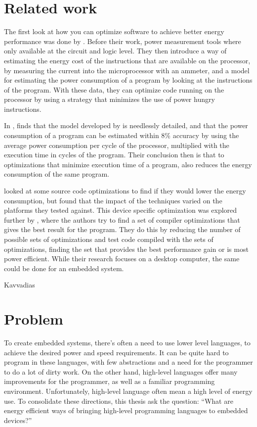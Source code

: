 \section{Related work}
The first look at how you can optimize software to achieve better energy performance was done by \cite{tiwari94}.
Before their work, power measurement tools where only available at the circuit and logic level.
They then introduce a way of estimating the energy cost of the instructions that are available on the processor, by measuring the current into the microprocessor with an ammeter, and a model for estimating the power consumption of a program by looking at the instructions of the program.
With these data, they can optimize code running on the processor by using a strategy that minimizes the use of power hungry instructions.

In \cite{russell98}, finds that the model developed by \cite{tiwari94} is needlessly detailed, and that the power consumption of a program can be estimated within 8\% accuracy by using the average power consumption per cycle of the processor, multiplied with the execution time in cycles of the program.
Their conclusion then is that to optimizations that minimize execution time of a program, also reduces the energy consumption of the same program.

\cite{ortiz08} looked at some source code optimizations to find if they would lower the energy consumption, but found that the impact of the techniques varied on the platforms they tested against.
This device specific optimization was explored further by \cite{delima13}, where the authors try to find a set of compiler optimizations that gives the best result for the program.
They do this by reducing the number of possible sets of optimizations and test code compiled with the sets of optimizations, finding the set that provides the best performance gain or is most power efficient.
While their research focuses on a desktop computer, the same could be done for an embedded system.

Kavvadias

\section{Problem}
To create embedded systems, there’s often a need to use lower level languages, to achieve the desired power and speed requirements. It can be quite hard to program in these languages, with few abstractions and a need for the programmer to do a lot of dirty work. On the other hand, high-level languages offer many improvements for the programmer, as well as a familiar programming environment. Unfortunately, high-level language often mean a high level of energy use. To consolidate these directions, this thesis ask the question: “What are energy efficient ways of bringing high-level programming languages to embedded devices?”

